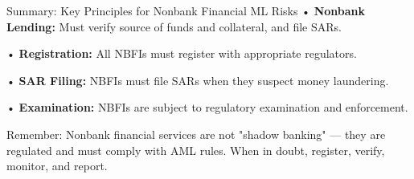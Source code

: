\documentclass[11pt,a4paper]{beamer}
\begin{document}
\begin{frame}{Summary: Key Principles for Nonbank Financial ML Risks}
\vspace{0.1cm}
\noindent• \textbf{Nonbank Lending:} Must verify source of funds and collateral, and file SARs.

\vspace{0.1cm}
\noindent• \textbf{Registration:} All NBFIs must register with appropriate regulators.

\vspace{0.1cm}
\noindent• \textbf{SAR Filing:} NBFIs must file SARs when they suspect money laundering.

\vspace{0.1cm}
\noindent• \textbf{Examination:} NBFIs are subject to regulatory examination and enforcement.

\vspace{0.3cm}
\centering
{Remember: Nonbank financial services are not "shadow banking" — they are regulated and must comply with AML rules. When in doubt, register, verify, monitor, and report.}
\end{frame}
\end{document}
